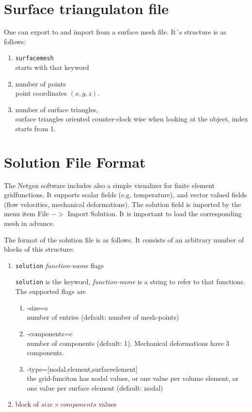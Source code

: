 \documentclass[12pt]{book}
\begin{document}
\section{Surface triangulaton file}
One can export to and import from a surface mesh file. It´s structure
is as follows:
\begin{enumerate}
\item
  {\tt surfacemesh} \\
  starts with that keyword
\item
  number of points \\
  point coordinates $(x,y,z)$.
\item
  number of surface triangles, \\
  surface triangles oriented counter-clock wise when looking at the 
  object, index starts from 1.
\end{enumerate}



\section{Solution File Format}
The Netgen software includes also a simple visualizer for finite
element gridfunctions. It supports scalar fields (e.g. temperature),
and vector valued fields (flow velocities, mechanical deformations).
The solution field is imported by the menu item File $->$ Import Solution.
It is important to load the corresponding mesh in advance.

The format of the solution file is as follows. It consists of an
arbitrary number of blocks of this structure:

\begin{enumerate}
\item
  {\tt solution} {\it function-name} flags
  
  {\tt solution} is the keyword, {\it function-name} is a string to
  refer to that functions. The supported flags are
  \begin{enumerate}
  \item -size=s \\
    number of entries (default: number of mesh-points)
  \item -components=c \\
    number of components (default: 1). Mechanical deformations have 3 components.
  \item -type=[nodal,element,surfaceelement] \\
    the grid-funciton has nodal values, or one value per volume element,
    or one value per surface element (default: nodal)
  \end{enumerate}
\item
  block of $size \times components$ values
\end{enumerate}
\end{document}
